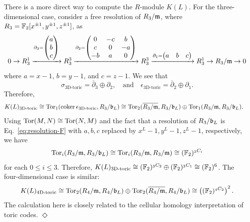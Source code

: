 \begin{example}
There is a more direct way to compute the $R$-module $K(L)$.
For the three-dimensional case, consider a free resolution of $R_3/\mathfrak{m}$,
where $R_3 = \mathbb{F}_2[x^{\pm 1},y^{\pm 1},z^{\pm 1}]$,
as
\[
 0 \to 
R_3^1 
\xrightarrow{
\partial_3 = 
\begin{pmatrix} a \\ b \\ c \end{pmatrix}
}
R_3^3
\xrightarrow{  
\partial_2 =
\begin{pmatrix}
 0 & -c & b  \\
 c & 0 & -a  \\
 -b & a & 0   
\end{pmatrix}
}
R_3^3
\xrightarrow{
\partial_1 =
\begin{pmatrix}
a & b  & c
\end{pmatrix}
}
R_3^1
\to
R_3/\mathfrak{m}
\to 0
\]
where $a=x-1$, $b=y-1$, and $c=z-1$.
We see that
\begin{equation}
 \sigma_\text{3D-toric} = \bar \partial_3 \oplus \partial_2 ,
 \quad \text{and} \quad
 \epsilon_\text{3D-toric} = \bar \partial_2 \oplus \partial_1  .
\label{eq:resolution-F}
\end{equation}
Therefore,
\begin{align*}
 K(L)_\text{3D-toric} \cong \mathop{\mathrm{Tor}}\nolimits_1(\mathop{\mathrm{coker}}\nolimits \epsilon_\text{3D-toric},R_3/\mathfrak{b}_L) 
&\cong \mathop{\mathrm{Tor}}\nolimits_2( \overline{ R_3/\mathfrak{m}}, R_3/\mathfrak{b}_L ) \oplus \mathop{\mathrm{Tor}}\nolimits_1( R_3/\mathfrak{m}, R_3/\mathfrak{b}_L ).
\end{align*}
Using $\mathop{\mathrm{Tor}}\nolimits(M,N) \cong \mathop{\mathrm{Tor}}\nolimits(N,M)$ and the fact that a resolution of $R_3/\mathfrak{b}_L$ is Eq.~\eqref{eq:resolution-F}
with $a,b,c$ replaced by $x^L-1,y^L-1,z^L-1$, respectively,
we have 
\[
 \mathop{\mathrm{Tor}}\nolimits_i(R_3/\mathfrak{m},R_3/\mathfrak{b}_L) \cong \mathop{\mathrm{Tor}}\nolimits_i(R_3/\mathfrak{m},R_3/\mathfrak{m}) \cong (\mathbb{F}_2)^{_3 C _i}
\]
for each $0 \le i \le 3$.
Therefore, $K(L)_\text{3D-toric} \cong (\mathbb{F}_2)^{_3 C _2} \oplus (\mathbb{F}_2)^{_3 C _1} \cong (\mathbb{F}_2)^6$.
The four-dimensional case is similar:
\[
 K(L)_\text{4D-toric} \cong \mathop{\mathrm{Tor}}\nolimits_2 (R_4/\mathfrak{m}, R_4/\mathfrak{b}_L) \oplus \mathop{\mathrm{Tor}}\nolimits_2 (\overline{R_4/\mathfrak{m}}, R_4/\mathfrak{b}_L) \cong \left( (\mathbb{F}_2)^{_4 C _2} \right)^2 .
\]
The calculation here is closely related
to the cellular homology interpretation of toric codes.
\hfill $\Diamond$
\end{example} %

